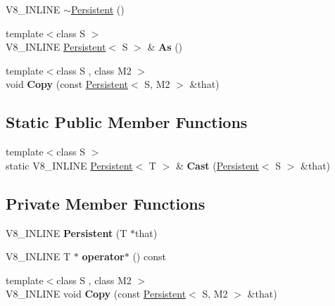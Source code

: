 \begin{DoxyCompactItemize}
\item 
V8\+\_\+\+I\+N\+L\+I\+NE \hyperlink{classv8_1_1_persistent_a7d4d2bebfe3919e447e22adc15464e25}{$\sim$\+Persistent} ()
\item 
{\footnotesize template$<$class S $>$ }\\V8\+\_\+\+I\+N\+L\+I\+NE \hyperlink{classv8_1_1_persistent}{Persistent}$<$ S $>$ \& {\bfseries As} ()\hypertarget{classv8_1_1_persistent_a8d2c96e559ac88f6201d98cb2a626808}{}\label{classv8_1_1_persistent_a8d2c96e559ac88f6201d98cb2a626808}

\item 
{\footnotesize template$<$class S , class M2 $>$ }\\void {\bfseries Copy} (const \hyperlink{classv8_1_1_persistent}{Persistent}$<$ S, M2 $>$ \&that)\hypertarget{classv8_1_1_persistent_ace50a178e3b772f75611e22e41fae974}{}\label{classv8_1_1_persistent_ace50a178e3b772f75611e22e41fae974}

\end{DoxyCompactItemize}
\subsection*{Static Public Member Functions}
\begin{DoxyCompactItemize}
\item 
{\footnotesize template$<$class S $>$ }\\static V8\+\_\+\+I\+N\+L\+I\+NE \hyperlink{classv8_1_1_persistent}{Persistent}$<$ T $>$ \& {\bfseries Cast} (\hyperlink{classv8_1_1_persistent}{Persistent}$<$ S $>$ \&that)\hypertarget{classv8_1_1_persistent_aa20fd9af0b410df9e887689ef97c28dd}{}\label{classv8_1_1_persistent_aa20fd9af0b410df9e887689ef97c28dd}

\end{DoxyCompactItemize}
\subsection*{Private Member Functions}
\begin{DoxyCompactItemize}
\item 
V8\+\_\+\+I\+N\+L\+I\+NE {\bfseries Persistent} (T $\ast$that)\hypertarget{classv8_1_1_persistent_a36492cc837502c9c82ba12a72bf5fb49}{}\label{classv8_1_1_persistent_a36492cc837502c9c82ba12a72bf5fb49}

\item 
V8\+\_\+\+I\+N\+L\+I\+NE T $\ast$ {\bfseries operator$\ast$} () const \hypertarget{classv8_1_1_persistent_a4772ffaf92f953c74b4cb2b3a6dc2c39}{}\label{classv8_1_1_persistent_a4772ffaf92f953c74b4cb2b3a6dc2c39}

\item 
{\footnotesize template$<$class S , class M2 $>$ }\\V8\+\_\+\+I\+N\+L\+I\+NE void {\bfseries Copy} (const \hyperlink{classv8_1_1_persistent}{Persistent}$<$ S, M2 $>$ \&that)\hypertarget{classv8_1_1_persistent_a23a4e84d5d013303896928d52d251283}{}\label{classv8_1_1_persistent_a23a4e84d5d013303896928d52d251283}

\end{DoxyCompactItemize}
